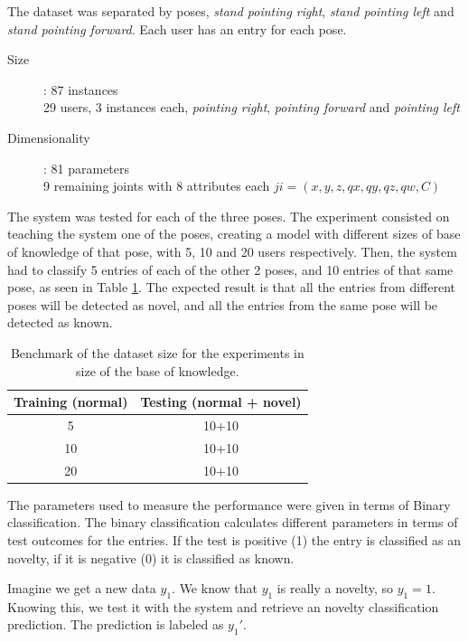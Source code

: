 The dataset was separated by poses, \emph{stand pointing right}, \emph{stand pointing left} and \emph{stand pointing forward}. Each user has an entry for each pose. 

\begin{description}
\item[Size]: 87 instances \\ 29 users, 3 instances each, \emph{pointing right}, \emph{pointing forward} and  \emph{pointing left}
\item[Dimensionality]: 81 parameters \\ 9 remaining joints with 8 attributes each $ji = (x,y,z,qx,qy,qz,qw,C)$
\end{description}

The system was tested for each of the three poses. The experiment consisted on teaching the system one of the poses, creating a model with different sizes of base of knowledge of that pose, with 5, 10 and 20 users respectively. Then, the system had to classify 5 entries of each of the other 2 poses, and 10 entries of that same pose, as seen in Table \ref{Tglo2}. The expected result is that all the entries from different poses will be detected as novel, and all the entries from the same pose will be detected as known.

\begin{table}[h]
    \begin{tabular}{cc}
    \hline
    Training (normal) & Testing (normal + novel) \\ 
    \hline
    5 & 10+10 \\
    10 & 10+10 \\
    20 & 10+10 \\
    \hline 
    \end{tabular}
    \centering
    \caption{Benchmark of the dataset size for the experiments in size of the base of knowledge. \label{Tglo2}}
\end{table}

The parameters used to measure the performance were given in terms of Binary classification. The binary classification calculates different parameters in terms of test outcomes for the entries. If the test is positive (1) the entry is classified as an novelty, if it is negative (0) it is classified as known.

Imagine we get a new data $y_1$. We know that $y_1$ is really a novelty, so $y_1 = 1$. Knowing this, we test it with the system and retrieve an novelty classification prediction. The prediction is labeled as $y_1'$.


